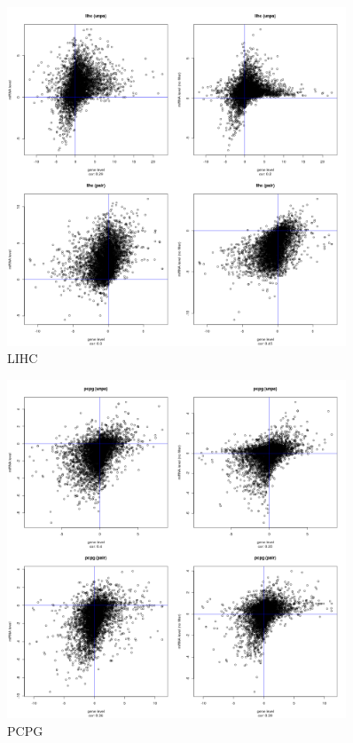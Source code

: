 \documentclass[a4paper,12pt]{article}
\begin{document}
\newpage

\begin{figure}[!h] 
\centering 
\includegraphics[width=0.9\textwidth]{plots/gene_vs_mirna_level_gsa_lihc.png} 
\caption{LIHC} 
\end{figure} 

\newpage

\begin{figure}[!h] 
\centering 
\includegraphics[width=0.9\textwidth]{plots/gene_vs_mirna_level_gsa_pcpg.png} 
\caption{PCPG} 
\end{figure} 
\end{document}
